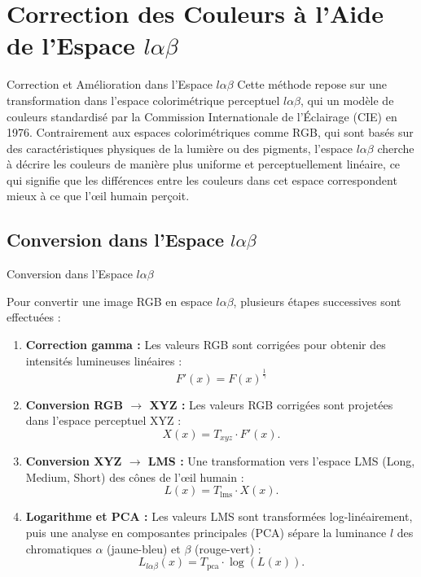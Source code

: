 \documentclass[8pt,a4paper]{beamer}
\numberwithin{figure}{section}
\begin{document}
\section{Correction des Couleurs à l'Aide de l'Espace \( l\alpha\beta \)}
\frame{\tableofcontents[currentsection]}


\begin{frame}{Correction et Amélioration dans l'Espace \( l\alpha\beta \)}
Cette méthode repose sur une transformation dans l'espace colorimétrique perceptuel $l\alpha\beta$, qui un modèle de couleurs standardisé par la Commission Internationale de l'Éclairage (CIE) en 1976. Contrairement aux espaces colorimétriques comme RGB, qui sont basés sur des caractéristiques physiques de la lumière ou des pigments, l'espace $l\alpha\beta$ cherche à décrire les couleurs de manière plus uniforme et perceptuellement linéaire, ce qui signifie que les différences entre les couleurs dans cet espace correspondent mieux à ce que l'œil humain perçoit.
\end{frame}

\subsection{Conversion dans l'Espace $l\alpha\beta$}
\begin{frame}{Conversion dans l'Espace $l\alpha\beta$}
\par Pour convertir une image RGB en espace \( l\alpha\beta \), plusieurs étapes successives sont effectuées :
\vspace{3mm}
\begin{enumerate}
    \item \textbf{Correction gamma :} Les valeurs RGB sont corrigées pour obtenir des intensités lumineuses linéaires :
    \[
    F'(x) = F(x)^{\frac{1}{\gamma}}
    \]
    \item \textbf{Conversion RGB \(\to\) XYZ :} Les valeurs RGB corrigées sont projetées dans l'espace perceptuel XYZ :
    \[
    X(x) = T_{xyz} \cdot F'(x).
    \]
    \item \textbf{Conversion XYZ \(\to\) LMS :} Une transformation vers l'espace LMS (Long, Medium, Short) des cônes de l'œil humain :
    \[
    L(x) = T_{\text{lms}} \cdot X(x).
    \]
    \item \textbf{Logarithme et PCA :} Les valeurs LMS sont transformées log-linéairement, puis une analyse en composantes principales (PCA) sépare la luminance \( l \) des chromatiques \( \alpha \) (jaune-bleu) et \( \beta \) (rouge-vert) :
    \[
    L_{l\alpha\beta}(x) = T_{\text{pca}} \cdot \log\left(L(x)\right).
    \]
\end{enumerate}
\end{frame}
\end{document}
